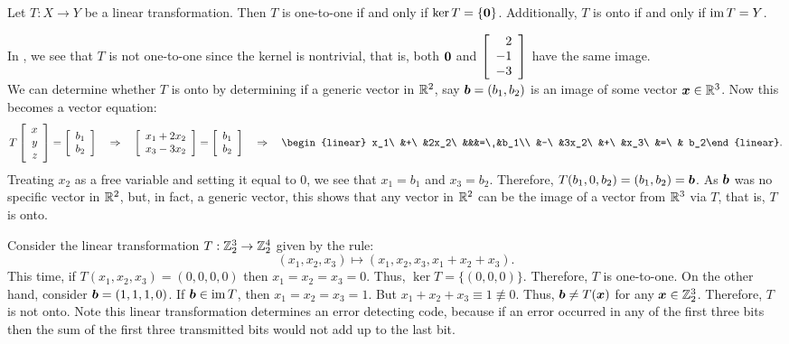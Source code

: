 \begin{Prop} Let $T : X \to Y$ be a linear transformation. Then $T$ is one-to-one if and only if $\ker T = \{\boldsymbol 0\}$. Additionally, $T$ is onto if and only if $\operatorname*{im} T = Y$.
\end{Prop}\vs

\begin{Exam} In , we see that $T$ is not one-to-one since the kernel is nontrivial, that is, both $\boldsymbol 0$ and $\left[\begin{array}{r} 2\\-1\\-3 \end{array}\right]$ have the same image. \\

We can determine whether $T$ is onto  by determining if a generic vector in $\mathbb{R}^2$, say $\boldsymbol b = (b_1,b_2)$ is an image of some vector $\boldsymbol x\in \mathbb{R}^3$. Now this becomes a vector equation:
\[T\vr{x\\y\\z} = \vr{b_1\\b_2}\qRightarrow \vr{x_1+2x_2 \\ x_3-3x_2} = \vr{b_1\\b_2} \qRightarrow \begin{linear} x_1\ &+\ &2x_2\ &&&=\ &b_1\\ &-\ &3x_2\ &+\ &x_3\ &=\ & b_2\end{linear}.\] Treating $x_2$ as a free variable and setting it equal to $0$, we see that $x_1=b_1$ and $x_3=b_2$. Therefore, $T(b_1,0,b_2) = (b_1,b_2) = \boldsymbol b$. As $\boldsymbol b$ was no specific vector in $\mathbb{R}^2$, but, in fact, a generic vector, this shows that any vector in $\mathbb{R}^2$ can be the image of a vector from $\mathbb{R}^3$ via $T$, that is, $T$ is onto.
\end{Exam}\vs

\begin{Exam} Consider the linear transformation $T : \mathbb{Z}_2^3 \to \mathbb{Z}_2^4$ given by the rule:
\[(x_1, x_2, x_3) \mapsto (x_1, x_2, x_3, x_1+x_2+x_3).\] This time, if $T(x_1,x_2,x_3) = (0,0,0,0)$ then $x_1 = x_2 = x_3 = 0$. Thus, $\ker T = \{(0,0,0)\}$. Therefore, $T$ is one-to-one. On the other hand, consider $\boldsymbol b = (1,1,1,0)$. If $\boldsymbol b \in \operatorname*{im} T$, then $x_1 = x_2 = x_3 = 1$. But $x_1+x_2+x_3 \equiv 1 \not\equiv 0$. Thus, $\boldsymbol b \neq T(\boldsymbol x)$ for any $\boldsymbol x \in \mathbb{Z}_2^3$. Therefore, $T$ is not onto. Note this linear transformation determines an error detecting code, because if an error occurred in any of the first three bits then the sum of the first three transmitted bits would not add up to the last bit.
\end{Exam}\vs

